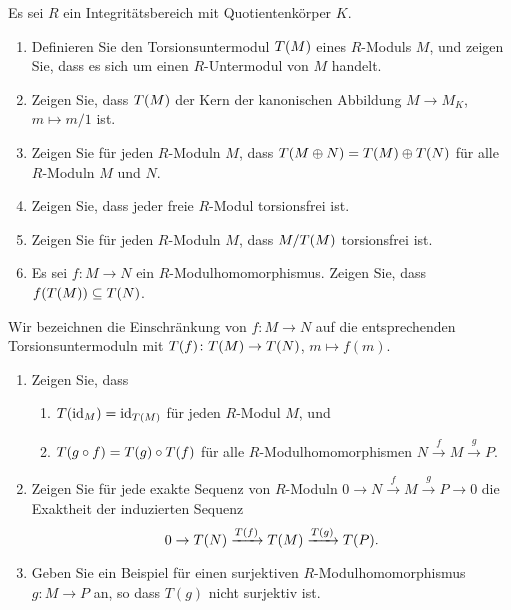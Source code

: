 \begin{question}[subtitle = Torsionsuntermoduln]
  Es sei $R$ ein Integritätsbereich mit Quotientenkörper $K$.
  \begin{enumerate}
    \item
      Definieren Sie den Torsionsuntermodul $T(M)$ eines $R$-Moduls $M$, und zeigen Sie, dass es sich um einen $R$-Untermodul von $M$ handelt.
    \item
      Zeigen Sie, dass $T(M)$ der Kern der kanonischen Abbildung $M \to M_K$, $m \mapsto m/1$ ist.
    \item
      Zeigen Sie für jeden $R$-Moduln $M$, dass $T(M \oplus N) = T(M) \oplus T(N)$ für alle $R$-Moduln $M$ und $N$.
    \item
      Zeigen Sie, dass jeder freie $R$-Modul torsionsfrei ist.
    \item
      Zeigen Sie für jeden $R$-Moduln $M$, dass $M/T(M)$ torsionsfrei ist.
    \item
      Es sei $f \colon M \to N$ ein $R$-Modulhomomorphismus.
      Zeigen Sie, dass $f(T(M)) \subseteq T(N)$.
  \end{enumerate}
  Wir bezeichnen die Einschränkung von $f \colon M \to N$ auf die entsprechenden Torsionsuntermoduln mit $T(f) \colon T(M) \to T(N)$, $m \mapsto f(m)$.
  \begin{enumerate}[resume]
    \item
      Zeigen Sie, dass
      \begin{enumerate}[leftmargin=*]
        \item
          $T(\operatorname{id}_M) = \operatorname{id}_{T(M)}$ für jeden $R$-Modul $M$, und
        \item
          $T(g \circ f) = T(g) \circ T(f)$ für alle $R$-Modulhomomorphismen $N \xrightarrow{f} M \xrightarrow{g} P$.
      \end{enumerate}
    \item
      Zeigen Sie für jede exakte Sequenz von $R$-Moduln $0 \to N \xrightarrow{f} M \xrightarrow{g} P \to 0$ die Exaktheit der induzierten Sequenz
      \[
                                  0
        \to                       T(N)
        \xrightarrow{T(f)} T(M)
        \xrightarrow{T(g)} T(P).
      \]
    \item
      Geben Sie ein Beispiel für einen surjektiven $R$-Modulhomomorphismus $g \colon M \to P$ an, so dass $T(g)$ nicht surjektiv ist.
  \end{enumerate}
\end{question}


